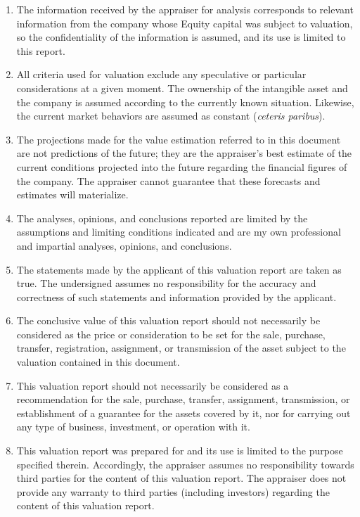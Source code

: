 \begin{enumerate}[\indent a)]
\item The information received by the appraiser for analysis corresponds to relevant information from the company whose Equity capital was subject to valuation, so the confidentiality of the information is assumed, and its use is limited to this report.

\item All criteria used for valuation exclude any speculative or particular considerations at a given moment. The ownership of the intangible asset and the company is assumed according to the currently known situation. Likewise, the current market behaviors are assumed as constant (\textit{ceteris paribus}).

\item The projections made for the value estimation referred to in this document are not predictions of the future; they are the appraiser's best estimate of the current conditions projected into the future regarding the financial figures of the company. The appraiser cannot guarantee that these forecasts and estimates will materialize.

\item The analyses, opinions, and conclusions reported are limited by the assumptions and limiting conditions indicated and are my own professional and impartial analyses, opinions, and conclusions.

\item The statements made by the applicant of this valuation report are taken as true. The undersigned assumes no responsibility for the accuracy and correctness of such statements and information provided by the applicant.

\item The conclusive value of this valuation report should not necessarily be considered as the price or consideration to be set for the sale, purchase, transfer, registration, assignment, or transmission of the asset subject to the valuation contained in this document.

\item This valuation report should not necessarily be considered as a recommendation for the sale, purchase, transfer, assignment, transmission, or establishment of a guarantee for the assets covered by it, nor for carrying out any type of business, investment, or operation with it.

\item This valuation report was prepared for \textcolor{principal}{\empresaSolicitante} and its use is limited to the purpose specified therein. Accordingly, the appraiser assumes no responsibility towards third parties for the content of this valuation report. The appraiser does not provide any warranty to third parties (including investors) regarding the content of this valuation report.


\end{enumerate}
